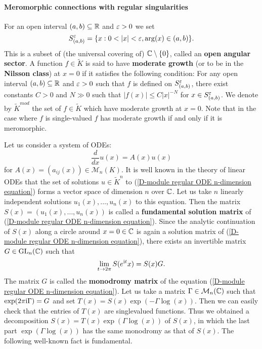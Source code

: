 \paragraph{Meromorphic connections with regular singularities}\label{D-module mero conn over C regularity paragraph}
For an open interval $(a,b)\subseteq\mathbb{R}$ and $\varepsilon>0$ we set
\[S^\eps_{(a,b)}=\{x:0<|x|<\eps,\arg(x)\in(a,b)\}.\]
This is a subset of (the universal covering of) $\mathbb{C}\setminus\{0\}$, called an \textbf{open angular sector}. A function $f\in\widetilde{K}$ is said to have \textbf{moderate growth} (or to be in the \textbf{Nilsson class}) at $x=0$ if it satisfies the following condition: For any open interval $(a,b)\subseteq\mathbb{R}$ and $\varepsilon>0$ such that $f$ is defined on $S^\varepsilon_{(a,b)}$, there exist constants $C>0$ and $N\gg 0$ such that $|f(x)|\leq C|x|^{-N}$ for $x\in S^\varepsilon_{(a,b)}$. We denote by $\widetilde{K}^{mod}$ the set of $f\in\widetilde{K}$ which have moderate growth at $x=0$. Note that in the case where $f$ is single-valued $f$ has moderate growth if and only if it is meromorphic.\par
Let us consider a system of ODEs:
\begin{equation}\label{D-module regular ODE n-dimension equation}
\frac{d}{dx}u(x)=A(x)u(x)
\end{equation}
for $A(x)=(a_{ij}(x))\in\mathcal{M}_n(K)$. It is well known in the theory of linear ODEs that the set of solutions $u\in\widetilde{K}^n$ to (\ref{D-module regular ODE n-dimension equation}) forms a vector space of dimension $n$ over $\mathbb{C}$. Let us take $n$ linearly independent solutions $u_1(x),\dots,u_n(x)$ to this equation. Then the matrix $S(x)=(u_1(x),\dots,u_n(x))$ is called a \textbf{fundamental solution matrix} of (\ref{D-module regular ODE n-dimension equation}). Since the analytic continuation of $S(x)$ along a circle around $x=0\in\mathbb{C}$ is again a solution matrix of (\ref{D-module regular ODE n-dimension equation}), there exists an invertible matrix $G\in\mathrm{GL}_n(\mathbb{C})$ such that
\[\lim_{t\to 2\pi}S(e^{\mathrm{i} t}x)=S(x)G.\]
The matrix $G$ is called the \textbf{monodromy matrix} of the equation (\ref{D-module regular ODE n-dimension equation}). Let us take a matrix $\Gamma\in\mathcal{M}_n(\mathbb{C})$ such that $\exp(2\pi\mathrm{i}\Gamma)=G$ and set $T(x)=S(x)\exp(-\Gamma\log(x))$. Then we can easily check that the entries of $T(x)$ are singlevalued functions. Thus we obtained a decomposition $S(x)=T(x)\exp(\Gamma\log(x))$ of $S(x)$, in which the last part $\exp(\Gamma\log(x))$ has the same monodromy as that of $S(x)$. The following well-known fact is fundamental.

